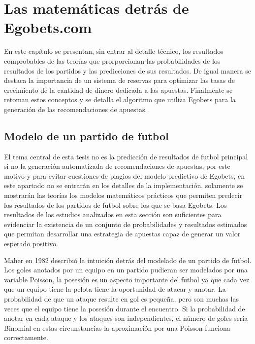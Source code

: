 \chapter{Las matemáticas detrás de Egobets.com}
\label{chap:mate}

En este capítulo se presentan, sin entrar al detalle técnico, los resultados comprobables de las teorías que prorporcionan las probabilidades de los resultados de los partidos y las predicciones de sus resultados. De igual manera se destaca la importancia de un sistema de reservas para optimizar las tasas de crecimiento de la cantidad de dinero dedicada a las apuestas. Finalmente se retoman estos conceptos y se detalla el algoritmo que utiliza Egobets para la generación de las recomendaciones de apuestas.



\section{Modelo de un partido de futbol}
\label{sec:modelo}

El tema central de esta tesis no es la predicción de resultados de futbol principal si no la generación automatizada de recomendaciones de apuestas, por este motivo y para evitar cuestiones de plagios del modelo predictivo de Egobets, en este apartado no se entrarán en los detalles de la implementación, solamente se mostrarán las teorías los modelos matemáticos prácticos que permiten predecir los resultados de los partidos de futbol sobre los que se basa Egobets. Los resultados de los estudios analizados en esta sección son suficientes para evidenciar la existencia de un conjunto de probabilidades y resultados estimados que permitan desarrollar una estrategia de apuestas capaz de generar un valor esperado positivo.

Maher en 1982 \cite{maher1982modelling} describió la intuición detrás del modelado de un partido de futbol. Los goles anotados por un equipo en un partido pudieran ser modelados por una variable Poisson, la posesión es un aspecto importante del futbol ya que cada vez que un equipo tiene la pelota tiene la oportunidad de atacar y anotar. La probabilidad de que un ataque resulte en gol es pequeña, pero son muchas las veces que el equipo tiene la posesión durante el encuentro. Si la probabilidad de anotar en cada ataque y los ataques son independientes, el número de goles sería Binomial en estas circunstancias la aproximación por una Poisson funciona correctamente.

